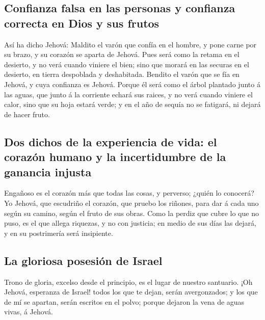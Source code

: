 \hypertarget{confianza-falsa-en-las-personas-y-confianza-correcta-en-dios-y-sus-frutos}{%
\subsection{Confianza falsa en las personas y confianza correcta en Dios
y sus
frutos}\label{confianza-falsa-en-las-personas-y-confianza-correcta-en-dios-y-sus-frutos}}

 Así ha dicho Jehová: Maldito el varón que confía en el
hombre, y pone carne por su brazo, y su corazón se aparta de Jehová.
 Pues será como la retama en el desierto, y no verá cuando
viniere el bien; sino que morará en las securas en el desierto, en
tierra despoblada y deshabitada.  Bendito el varón que se
fía en Jehová, y cuya confianza es Jehová.  Porque él será
como el árbol plantado junto á las aguas, que junto á la corriente
echará sus raices, y no verá cuando viniere el calor, sino que su hoja
estará verde; y en el año de sequía no se fatigará, ni dejará de hacer
fruto.

\hypertarget{dos-dichos-de-la-experiencia-de-vida-el-corazuxf3n-humano-y-la-incertidumbre-de-la-ganancia-injusta}{%
\subsection{Dos dichos de la experiencia de vida: el corazón humano y la
incertidumbre de la ganancia
injusta}\label{dos-dichos-de-la-experiencia-de-vida-el-corazuxf3n-humano-y-la-incertidumbre-de-la-ganancia-injusta}}

 Engañoso es el corazón más que todas las cosas, y
perverso; ¿quién lo conocerá?  Yo Jehová, que escudriño
el corazón, que pruebo los riñones, para dar á cada uno según su camino,
según el fruto de sus obras.  Como la perdiz que cubre lo
que no puso, es el que allega riquezas, y no con justicia; en medio de
sus días las dejará, y en su postrimería será insipiente.

\hypertarget{la-gloriosa-posesiuxf3n-de-israel}{%
\subsection{La gloriosa posesión de
Israel}\label{la-gloriosa-posesiuxf3n-de-israel}}

 Trono de gloria, excelso desde el principio, es el lugar
de nuestro santuario.  ¡Oh Jehová, esperanza de Israel!
todos los que te dejan, serán avergonzados; y los que de mí se apartan,
serán escritos en el polvo; porque dejaron la vena de aguas vivas, á
Jehová.

